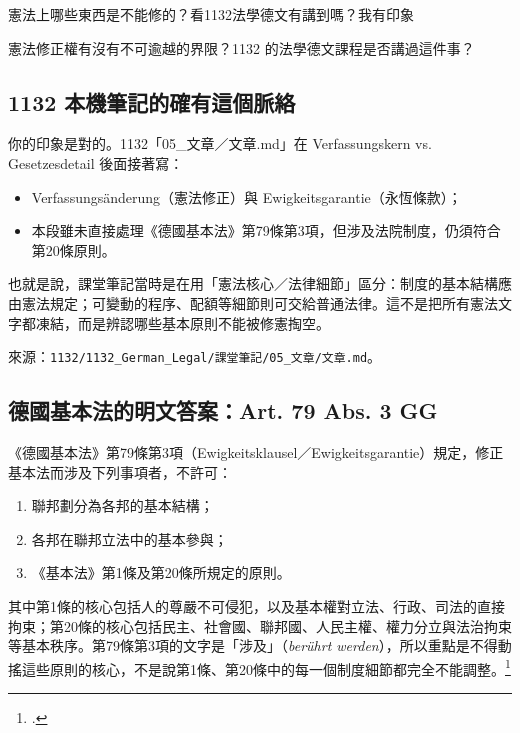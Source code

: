 \begin{qaprompt}
憲法上哪些東西是不能修的？看1132法學德文有講到嗎？我有印象
\end{qaprompt}

\begin{qaquestion}
憲法修正權有沒有不可逾越的界限？1132 的法學德文課程是否講過這件事？
\end{qaquestion}

\subsection{1132 本機筆記的確有這個脈絡}

你的印象是對的。1132「05\_文章／文章.md」在 Verfassungskern vs. Gesetzesdetail 後面接著寫：

\begin{itemize}
\tightlist
\item
  Verfassungsänderung（憲法修正）與 Ewigkeitsgarantie（永恆條款）；
\item
  本段雖未直接處理《德國基本法》第79條第3項，但涉及法院制度，仍須符合第20條原則。
\end{itemize}

也就是說，課堂筆記當時是在用「憲法核心／法律細節」區分：制度的基本結構應由憲法規定；可變動的程序、配額等細節則可交給普通法律。這不是把所有憲法文字都凍結，而是辨認哪些基本原則不能被修憲掏空。

來源：\texttt{1132/1132\_German\_Legal/課堂筆記/05\_文章/文章.md}。

\subsection{德國基本法的明文答案：Art. 79 Abs. 3 GG}

《德國基本法》第79條第3項（Ewigkeitsklausel／Ewigkeitsgarantie）規定，修正基本法而涉及下列事項者，不許可：

\begin{enumerate}
\def\labelenumi{\arabic{enumi}.}
\tightlist
\item
  聯邦劃分為各邦的基本結構；
\item
  各邦在聯邦立法中的基本參與；
\item
  《基本法》第1條及第20條所規定的原則。
\end{enumerate}

其中第1條的核心包括人的尊嚴不可侵犯，以及基本權對立法、行政、司法的直接拘束；第20條的核心包括民主、社會國、聯邦國、人民主權、權力分立與法治拘束等基本秩序。第79條第3項的文字是「涉及」（\emph{berührt werden}），所以重點是不得動搖這些原則的核心，不是說第1條、第20條中的每一個制度細節都完全不能調整。\footcite[Art. 79]{gg}


